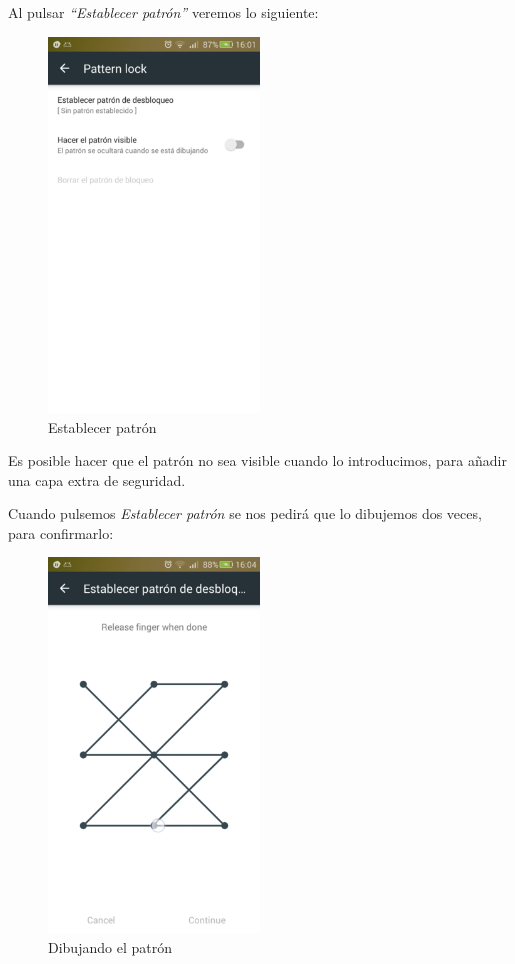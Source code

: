 \documentclass[	DIV=calc,%
							paper=a4,%
							fontsize=11pt]{scrartcl}	 					%
\begin{document}
Al pulsar \emph{``Establecer patrón''} veremos lo siguiente:

\begin{figure}[H]
\centering
\includegraphics[width=0.5\textwidth]{./img/setPattern.png}
\caption{Establecer patrón}
\end{figure}

Es posible hacer que el patrón no sea visible cuando lo introducimos,
para añadir una capa extra de seguridad.

Cuando pulsemos \emph{Establecer patrón} se nos pedirá que lo dibujemos
dos veces, para confirmarlo:

\begin{figure}[H]
\centering
\includegraphics[width=0.5\textwidth]{./img/drawingPatter.png}
\caption{Dibujando el patrón}
\end{figure}
\end{document}
